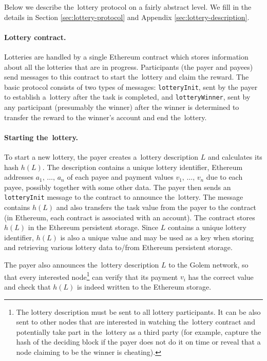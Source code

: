 \documentclass[a4paper]{article}
\begin{document}
    Below we describe the~lottery protocol on a fairly abstract level. We fill in the details in Section
    \ref{sec:lottery-protocol} and Appendix \ref{sec:lottery-description}.

    \paragraph{Lottery contract.}
    Lotteries are handled by a single Ethereum contract which stores information about all the lotteries that are in
    progress. Participants (the payer and payees) send messages to this contract to start the~lottery and claim
    the reward. The basic protocol consists of two types of messages: \texttt{lotteryInit}, sent by the payer to
    establish a~lottery after the task is completed, and \texttt{lotteryWinner}, sent by any participant
    (presumably the winner) after the winner is determined to transfer the reward to the winner's account and end
    the~lottery.

    \paragraph{Starting the~lottery.}
    To start a new lottery, the payer creates a~lottery description $L$ and calculates its hash $h(L)$. The
    description contains a unique lottery identifier, Ethereum addresses $a_1,\,\ldots,\,a_n$ of each payee and
    payment values $v_1,\,\ldots,\,v_n$ due to each payee, possibly together with some other data. The payer then
    sends an \texttt{lotteryInit} message to the contract to announce the~lottery. The message contains $h(L)$ and
    also transfers the task value from the payer to the contract (in Ethereum, each contract is associated with an
    account). The contract stores $h(L)$ in the Ethereum persistent storage. Since $L$ contains a unique lottery
    identifier, $h(L)$ is also a unique value and may be used as a key when storing and retrieving various lottery
    data to/from Ethereum persistent storage.

    The payer also announces the~lottery description $L$ to the Golem network, so that every interested
    node\footnote{ The lottery description must be sent to all lottery participants. It can be also sent to other
    nodes that are interested in watching the~lottery contract and potentially take part in the~lottery as a
    third party (for example, capture the hash of the deciding block if the payer does not do it on time or reveal
    that a node claiming to be the winner is cheating).}
    can verify that its payment $v_i$ has the correct value and check that $h(L)$ is indeed written to the Ethereum
    storage.
\end{document}
